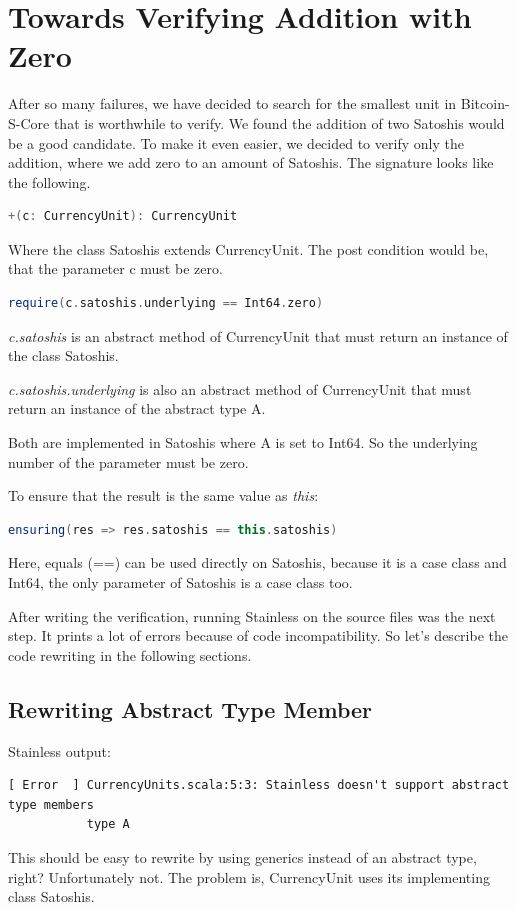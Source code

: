 \chapter{Towards Verifying Addition with Zero}
After so many failures, we have decided to search for the smallest unit in Bitcoin-S-Core that is worthwhile to verify.
We found the addition of two Satoshis would be a good candidate.
To make it even easier, we decided to verify only the addition, where we add zero to an amount of Satoshis.
The signature looks like the following.
\begin{lstlisting}[language=scala]
  +(c: CurrencyUnit): CurrencyUnit
\end{lstlisting}

Where the class Satoshis extends CurrencyUnit.
The post condition would be, that the parameter c must be zero.
\begin{lstlisting}[language=scala]
  require(c.satoshis.underlying == Int64.zero)
\end{lstlisting}

\emph{c.satoshis} is an abstract method of CurrencyUnit that must return an instance of the class Satoshis.

\emph{c.satoshis.underlying} is also an abstract method of CurrencyUnit that must return an instance of the abstract type A.

Both are implemented in Satoshis where A is set to Int64.
So the underlying number of the parameter must be zero.

To ensure that the result is the same value as \emph{this}:
\begin{lstlisting}[language=scala]
  ensuring(res => res.satoshis == this.satoshis)
\end{lstlisting}

Here, equals (==) can be used directly on Satoshis, because it is a case class and Int64, the only parameter of Satoshis is a case class too.

After writing the verification, running Stainless on the source files was the next step.
It prints a lot of errors because of code incompatibility.
So let's describe the code rewriting in the following sections.


\section{Rewriting Abstract Type Member}
Stainless output:
\begin{lstlisting}
[ Error  ] CurrencyUnits.scala:5:3: Stainless doesn't support abstract type members
           type A
\end{lstlisting}
This should be easy to rewrite by using generics instead of an abstract type, right?
Unfortunately not.
The problem is, CurrencyUnit uses its implementing class Satoshis.

